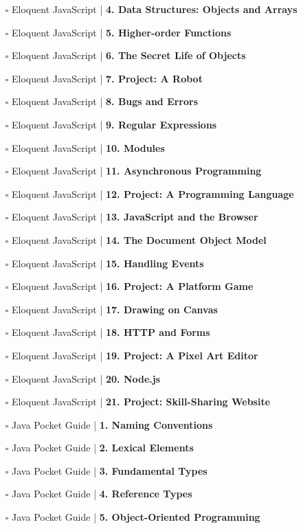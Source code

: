 \documentclass[a4, landscape, 12pt]{article}
\newcommand{\checkbox}{$\square$}%
\begin{document}
\begin{itemize}
{}
\item [\checkbox]  Eloquent JavaScript | \textbf{ 4. Data Structures: Objects and Arrays
}
\item [\checkbox]  Eloquent JavaScript | \textbf{ 5. Higher-order Functions
}
\item [\checkbox]  Eloquent JavaScript | \textbf{ 6. The Secret Life of Objects
}
\item [\checkbox]  Eloquent JavaScript | \textbf{ 7. Project: A Robot
}
\item [\checkbox]  Eloquent JavaScript | \textbf{ 8. Bugs and Errors
}
\item [\checkbox]  Eloquent JavaScript | \textbf{ 9. Regular Expressions
}
\item [\checkbox]  Eloquent JavaScript | \textbf{ 10. Modules
}
\item [\checkbox]  Eloquent JavaScript | \textbf{ 11. Asynchronous Programming
}
\item [\checkbox]  Eloquent JavaScript | \textbf{ 12. Project: A Programming Language
}
\item [\checkbox]  Eloquent JavaScript | \textbf{ 13. JavaScript and the Browser
}
\item [\checkbox]  Eloquent JavaScript | \textbf{ 14. The Document Object Model
}
\item [\checkbox]  Eloquent JavaScript | \textbf{ 15. Handling Events
}
\item [\checkbox]  Eloquent JavaScript | \textbf{ 16. Project: A Platform Game
}
\item [\checkbox]  Eloquent JavaScript | \textbf{ 17. Drawing on Canvas
}
\item [\checkbox]  Eloquent JavaScript | \textbf{ 18. HTTP and Forms
}
\item [\checkbox]  Eloquent JavaScript | \textbf{ 19. Project: A Pixel Art Editor
}
\item [\checkbox]  Eloquent JavaScript | \textbf{ 20. Node.js
}
\item [\checkbox]  Eloquent JavaScript | \textbf{ 21. Project: Skill-Sharing Website
}
\item [\checkbox]  Java Pocket Guide  | \textbf{ 1. Naming Conventions
}
\item [\checkbox]  Java Pocket Guide  | \textbf{ 2. Lexical Elements
}
\item [\checkbox]  Java Pocket Guide  | \textbf{ 3. Fundamental Types
}
\item [\checkbox]  Java Pocket Guide  | \textbf{ 4. Reference Types
}
\item [\checkbox]  Java Pocket Guide  | \textbf{ 5. Object-Oriented Programming
}
\end{itemize}
\end{document}
